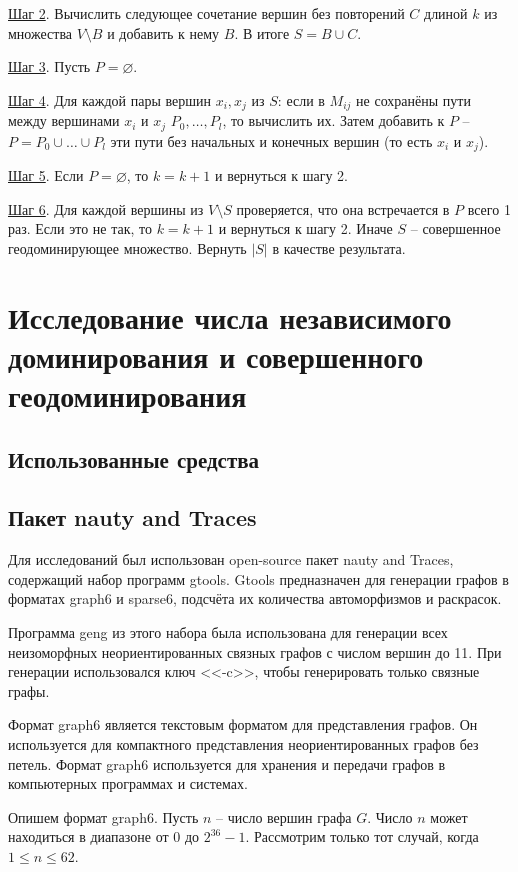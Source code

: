 \documentclass[bachelor, och, nir]{SCWorks}
\begin{document}
\underline{Шаг 2}. Вычислить следующее сочетание вершин без повторений $C$ длиной $k$ из множества
$V \setminus B$ и добавить к нему $B$. В итоге $S = B \cup C$.

\underline{Шаг 3}. Пусть $P = \varnothing$.

\underline{Шаг 4}. Для каждой пары вершин $x_i, x_j$ из $S$: если в $M_{ij}$ не сохранёны пути между вершинами
$x_i$ и $x_j$ $P_0, \dots, P_l$, то вычислить их. Затем добавить к $P$ -- $P = P_0 \cup \dots \cup P_l$ эти пути без начальных и конечных вершин (то есть $x_i$ и $x_j$).

\underline{Шаг 5}. Если $P = \varnothing$, то $k = k + 1$ и вернуться к шагу 2.

\underline{Шаг 6}. Для каждой вершины из $V \setminus S$ проверяется, что она встречается
в $P$ всего 1 раз. Если это не так, то $k = k + 1$ и вернуться к шагу 2. Иначе $S$ --
совершенное геодоминирующее множество. Вернуть $|S|$ в качестве результата.

\section{Исследование числа независимого доминирования и совершенного геодоминирования}
\subsection{Использованные средства}
\subsection{Пакет nauty and Traces}
Для исследований был использован open-source пакет nauty and Traces, 
содержащий набор программ gtools. Gtools предназначен для генерации 
графов в форматах graph6 и sparse6, подсчёта их количества автоморфизмов 
и раскрасок.

Программа geng из этого набора была использована для генерации всех 
неизоморфных неориентированных связных графов с числом вершин до 11.
При генерации использовался ключ <<-c>>, чтобы генерировать только связные графы.

Формат graph6 является текстовым форматом для представления графов. Он используется для компактного представления неориентированных графов без петель. Формат graph6 используется для хранения и передачи графов в компьютерных программах и системах.

Опишем формат graph6. Пусть $n$ -- число вершин графа $G$. Число $n$ может находиться в диапазоне от $0$ до $2^{36} - 1$. Рассмотрим только тот случай, когда $1 \leq n \leq 62$. 
\end{document}
